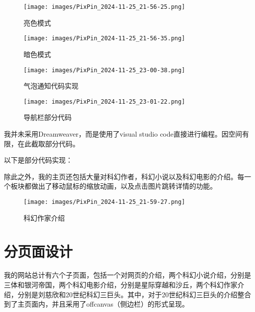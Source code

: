 \documentclass[supercite]{Experimental_Report}
\theoremstyle{definition}
\begin{document}
\begin{figure}[htb]
	\begin{center}
		\texttt{[image: images/PixPin\_2024-11-25\_21-56-25.png]}
		\caption{亮色模式}
		\label{fig2-1}
	\end{center}
\end{figure}

\begin{figure}[htb]
	\begin{center}
		\texttt{[image: images/PixPin\_2024-11-25\_21-56-35.png]}
		\caption{暗色模式}
		\label{fig2-1}
	\end{center}
\end{figure}

\begin{figure}[htb]
	\begin{center}
		\texttt{[image: images/PixPin\_2024-11-25\_23-00-38.png]}
		\caption{气泡通知代码实现}
		\label{fig2-1}
	\end{center}
\end{figure}

\begin{figure}[htb]
	\begin{center}
		\texttt{[image: images/PixPin\_2024-11-25\_23-01-22.png]}
		\caption{导航栏部分代码}
		\label{fig2-1}
	\end{center}
\end{figure}

我并未采用Dreamweaver，而是使用了visual studio code直接进行编程。因空间有限，在此截取部分代码。


以下是部分代码实现：

除此之外，我的主页还包括大量对科幻作者，科幻小说以及科幻电影的介绍。每一个板块都做出了移动鼠标的缩放动画，以及点击图片跳转详情的功能。

\begin{figure}[htb]
    \centering
    \texttt{[image: images/PixPin\_2024-11-25\_21-59-27.png]}
    \caption{科幻作家介绍}
    \label{fig:enter-label}
\end{figure}


\newpage

\section{分页面设计}

我的网站总计有六个子页面，包括一个对网页的介绍，两个科幻小说介绍，分别是三体和银河帝国，两个科幻电影介绍，分别是星际穿越和沙丘，两个科幻作家介绍，分别是刘慈欣和20世纪科幻三巨头。其中，对于20世纪科幻三巨头的介绍整合到了主页面内，并且采用了offcanvas（侧边栏）的形式呈现。
\end{document}
